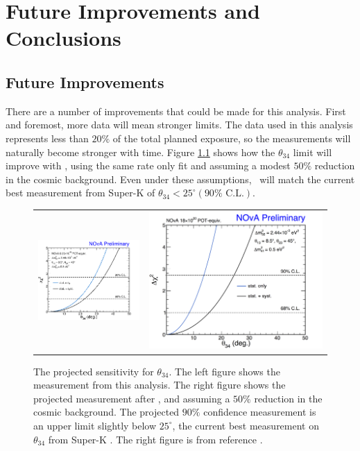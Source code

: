 \chapter{Future Improvements and Conclusions}
\label{conclusion}

\section{Future Improvements}
\label{sec:Future}

There are a number of improvements that could be made for this analysis. First and foremost, more data will mean stronger limits. The data used in this analysis represents less than $20\%$ of the total planned exposure, so the measurements will naturally become stronger with time. Figure \ref{fig:Fit3yr} shows how the $\theta_{34}$ limit will improve with , using the same rate only fit and assuming a modest $50\%$ reduction in the cosmic background. Even under these assumptions, \nova~will match the current best measurement from Super-K \cite{ref:SuperKSterile} of $\theta_{34} < 25^\circ (90\% \mbox{ C.L.})$.
\begin{figure}[htb]
  \centering
  \begin{tabular}{c c}
    \includegraphics[width=.47\textwidth]{figures/Fits/1DTh34.png} &
    \includegraphics[width=.47\textwidth]{figures/Fits/1DTh34_3yr.png} \\
  \end{tabular}
  \caption[Projected Sensitivity for $\theta_{34}$ After .]{The projected sensitivity for $\theta_{34}$. The left figure shows the measurement from this analysis. The right figure shows the projected measurement after , and assuming a $50\%$ reduction in the cosmic background. The projected $90\%$ confidence measurement is an upper limit slightly below $25^\circ$, the current best measurement on $\theta_{34}$ from Super-K \cite{ref:SuperKSterile}. The right figure is from reference \cite{ref:JETPNC}.}
  \label{fig:Fit3yr}
\end{figure}

